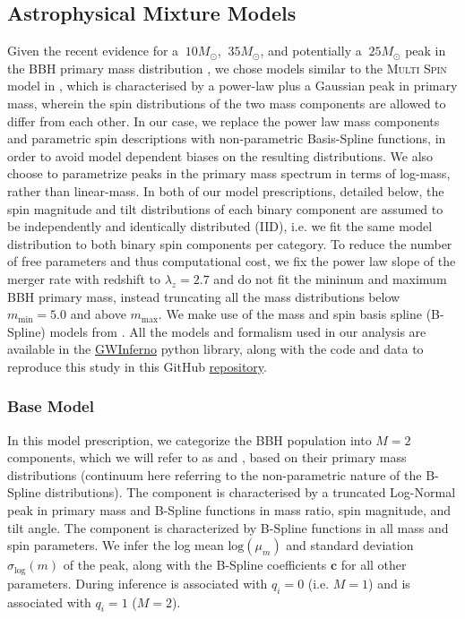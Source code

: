 \subsection{Astrophysical Mixture Models} \label{sec:astromodels} 

Given the recent evidence for a $~10 M_{\odot}$, $~35 M_{\odot}$, and potentially a $~25 M_{\odot}$ peak in the BBH primary mass distribution \citep{2111.03634, 2022ApJ...928..155T, 10.3847/2041-8213/aa9bf6, 10.3847/1538-4357/aab34c, 10.3847/2041-8213/ab3800, 2021ApJ...913L...7A}, we chose models similar to the \textsc{Multi Spin} model in \cite{2021ApJ...913L...7A}, which is characterised by a power-law plus a Gaussian peak in primary mass, wherein the spin distributions of the two mass components are allowed to differ from each other. In our case, we replace the power law mass components and parametric spin descriptions with non-parametric Basis-Spline functions, in order to avoid model dependent biases on the resulting distributions.
We also choose to parametrize peaks in the primary mass spectrum in terms of log-mass, rather than linear-mass. 
In both of our model prescriptions, detailed below, the spin magnitude and tilt distributions of each binary component are assumed to be independently and identically distributed (IID), i.e. we fit the same model distribution to both binary spin components per category. To reduce the number of free parameters and thus computational cost, we fix the power law slope of the merger rate with redshift to $\lambda_z=2.7$ and do not fit the mininum and maximum BBH primary mass, instead truncating all the mass distributions below $m_\text{min} = 5.0$ and above $m_\text{max}$. We make use of the mass and spin basis spline (B-Spline) models from \cite{2022arXiv221012834E}. All the models and formalism used in our analysis are available in the \href{https://git.ligo.org/bruce.edelman/gwinferno}{GWInferno} python library, along with the code and data to reproduce this study in this GitHub \href{https://github.com/jaxeng/paper}{repository}. 



\subsubsection{Base Model}
In this model prescription, we categorize the BBH population into $M=2$ components, which we will refer to as \first{} and \contB{}, based on their primary mass distributions (continuum here referring to the non-parametric nature of the B-Spline distributions). The \first{} component is characterised by a truncated Log-Normal peak in primary mass and B-Spline functions in mass ratio, spin magnitude, and tilt angle. The \contB{} component is characterized by B-Spline functions in all mass and spin parameters. We infer the log mean $\text{log}(\mu_m)$ and standard deviation $\sigma_\text{log}(m)$ of the peak, along with the B-Spline coefficients $\mathbf{c}$ for all other parameters. During inference \first{} is associated with $q_i = 0$ (i.e. $M=1$) and \contB{} is associated with $q_i = 1$ ($M=2$).

